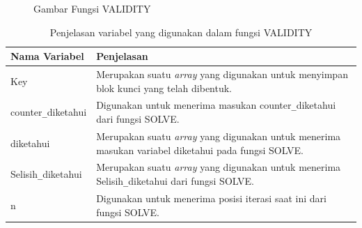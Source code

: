  \begin{figure}[H]
		\centering
		\caption{Gambar Fungsi VALIDITY}
		\label{fig:validity}
	\end{figure}
	
	 \begin{table}[H]
	 	\caption{Penjelasan variabel yang digunakan dalam fungsi VALIDITY}
		\begin{tabular}   {|p{3cm}|p{6cm}|}\hline
		Nama Variabel&Penjelasan \\ \hline
		Key&Merupakan suatu \textit{array} yang digunakan untuk menyimpan blok kunci yang telah dibentuk. \\ \hline
		counter\verb|_|diketahui&Digunakan untuk menerima masukan counter\verb|_|diketahui dari fungsi SOLVE.\\ \hline
		diketahui&Merupakan suatu \textit{array} yang digunakan untuk menerima masukan variabel diketahui pada fungsi SOLVE. \\ \hline
		Selisih\verb|_|diketahui&Merupakan suatu \textit{array} yang digunakan untuk menerima Selisih\verb|_|diketahui dari fungsi SOLVE. \\ \hline
		n&Digunakan untuk menerima posisi iterasi saat ini dari fungsi SOLVE. \\ \hline
		\end{tabular}%
		\label{tab:solvar}
	\end{table}